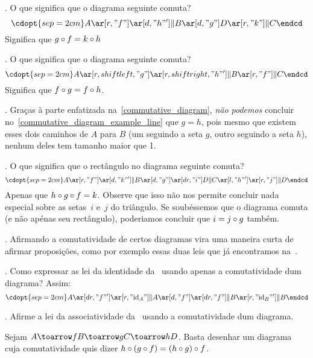 \example.
O que significa que o diagrama seguinte comuta?
$$
\cdopt{sep=2cm}
A   \ar[r, "f"]\ar[d, "h"'] \| B \ar[d, "g"] \\
D   \ar[r, "k"]             \| C
\endcd
$$
Significa que $g\of f  = k\of h$
\endexample

\example.
\label{commutative_diagram_example_line}%
O que significa que o diagrama seguinte comuta?
$$
\cdopt{sep=2cm}
A   \ar[r, shift left, "g"]\ar[r, shift right, "h"'] \| B \ar[r, "f"]  \|  C
\endcd
$$
Significa que $f\of g  = f\of h$.
\endexample

\beware.
Graças à parte enfatizada na~\ref{commutative_diagram}, \emph{não podemos}
concluir no~\ref{commutative_diagram_example_line} que $g = h$, pois mesmo que
existem esses dois caminhos de $A$ para $B$ (um seguindo a seta $g$, outro
seguindo a seta $h$), nenhum deles tem tamanho maior que 1.

\example.
O que significa que o rectângulo no diagrama seguinte comuta?
$$
\cdopt{sep=2cm}
A   \ar[r, "f"]\ar[d, "k"'] \| B \ar[d, "g"]  \ar[dr, "i"] \\
D                           \| C \ar[l, "h"'] \ar[r, "j"] \| D 
\endcd
$$
Apenas que $h \of g \of f = k$.
Observe que isso não nos permite concluir nada especial sobre as
setas~$i$ e~$j$ do triângulo.  Se soubéssemos que o diagrama
comuta (e não apénas seu rectângulo), poderiamos concluir
que $i = j\of g$ também.
\endexample

\blah.
Afirmando a comutatividade de certos diagramas vira uma maneira curta de
afirmar proposições, como por exemplo essas duas leis que já encontramos
na~.

\example.
\label{commutative_diagram_id_laws}%
Como expressar as lei da identidade da~ usando
apenas a comutatividade dum diagrama?
Assim:
$$
\cdopt{sep=2cm}
A   \ar[dr, "f"']\ar[r, "\id_A"] \| A \ar[d, "f"]  \ar[dr, "f"]   \\
                                 \| B \ar[r, "\id_B"'] \| B
\endcd
$$
\endexample

\exercise.
\label{commutative_diagram_associativity_law}%
Afirme a lei da associatividade da~
usando a comutatividade dum diagrama.

\hint
Sejam $A\toarrow f B \toarrow g C \toarrow h D$.
Basta desenhar um diagrama cuja comutatividade quis dizer
$h \of (g \of f) = (h \of g) \of f$.

